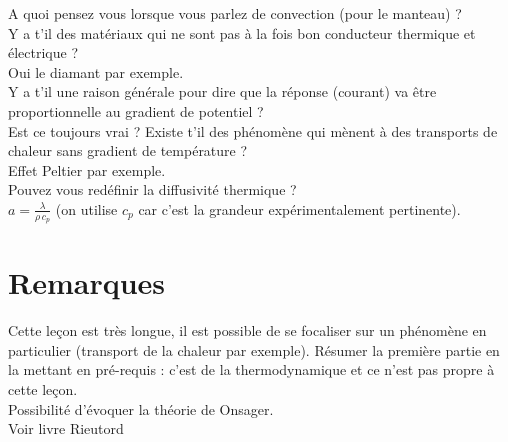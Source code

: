 \documentclass[12pt,prb,aps,epsf]{article}
\begin{document}
A quoi pensez vous lorsque vous parlez de convection (pour le manteau) ?\\

Y a t'il des matériaux qui ne sont pas à la fois bon conducteur thermique et électrique ?\\
Oui le diamant par exemple.\\

Y a t'il une raison générale pour dire que la réponse (courant) va être proportionnelle au gradient de potentiel ?\\

Est ce toujours vrai ? Existe t'il des phénomène qui mènent à des transports de chaleur sans gradient de température ?\\
Effet Peltier par exemple.\\

Pouvez vous redéfinir la diffusivité thermique ?\\
$a = \frac{\lambda}{\rho\,c_p}$ (on utilise $c_p$ car c'est la grandeur expérimentalement pertinente).

\section*{Remarques}
Cette leçon est très longue, il est possible de se focaliser sur un phénomène en particulier (transport de la chaleur par exemple). Résumer la première partie en la mettant en pré-requis : c'est de la thermodynamique et ce n'est pas propre à cette leçon.\\
Possibilité d'évoquer la théorie de Onsager.\\
Voir livre Rieutord
\end{document}
